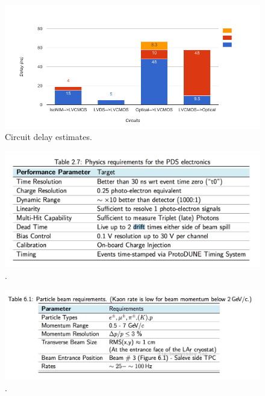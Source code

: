 \documentclass{report}
\begin{document}
 \begin{figure}[H]
     \centering
         \includegraphics[width=175mm]{ptbmk2_protodune_delays.png}
         \caption{Circuit delay estimates.}
 \end{figure}


 \begin{figure}[H]
     \centering
         \includegraphics[width=175mm]{pds_specs.png}
         \caption{.}
 \end{figure}
 
  \begin{figure}[H]
     \centering
         \includegraphics[width=175mm]{beam_specs.png}
         \caption{.}
 \end{figure}
 
\end{document}
